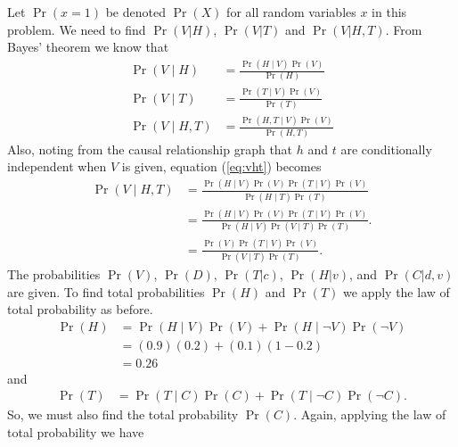\documentclass[letterpaper]{amsart}
\begin{document}
Let
$\Pr(x = 1)$
be denoted
$\Pr(X)$
for all random variables $x$ in this problem. We need to find
$\Pr(V| H)$,
$\Pr(V| T)$
and
$\Pr(V| H, T)$.
From Bayes' theorem we know that
\begin{align}
  \Pr(V\mid H) &= \frac{\Pr(H\mid V)\Pr(V)}{\Pr(H)} \\
  \Pr(V\mid T) &= \frac{\Pr(T\mid V)\Pr(V)}{\Pr(T)} \\
  \Pr(V\mid H, T) &= \frac{\Pr(H, T\mid V)\Pr(V)}{\Pr(H,T)} \label{eq:vht}
\end{align}
Also, noting from the causal relationship graph that $h$ and $t$ are conditionally independent when \(V\) is given, equation (\ref{eq:vht}) becomes
\begin{align}
  \Pr(V\mid H, T) &= \frac{\Pr(H\mid V)\Pr(V)\Pr(T\mid V)\Pr(V)}{\Pr(H\mid T)\Pr(T)}
  \\
  &=
    \frac{\Pr(H\mid V)\Pr(V)\Pr(T\mid V)\Pr(V)}
    {\Pr(H\mid V)\Pr(V \mid T)\Pr(T)}.
  \\
  &=
    \frac{\Pr(V)\Pr(T\mid V)\Pr(V)}
    {\Pr(V \mid T)\Pr(T)}.
\end{align}
The probabilities
$\Pr(V)$,
$\Pr(D)$,
$\Pr(T|c)$,
$\Pr(H|v)$,
and
$\Pr(C|d,v)$
are given. To find total probabilities $\Pr(H)$ and $\Pr(T)$
we apply the law of total probability as before.
\begin{align*}
  \Pr(H) &= \Pr(H\mid V)\Pr(V) +\Pr(H\mid\neg V)\Pr(\neg V)\\
  &= (0.9)(0.2)+(0.1)(1 - 0.2)\\
  &= 0.26
\end{align*}
and
\begin{align*}
  \Pr(T) &= \Pr(T\mid C)\Pr(C) +\Pr(T\mid\neg C)\Pr(\neg C).
\end{align*}
So, we must also find the total probability $\Pr(C)$.
Again, applying the law of total probability we have
\end{document}
